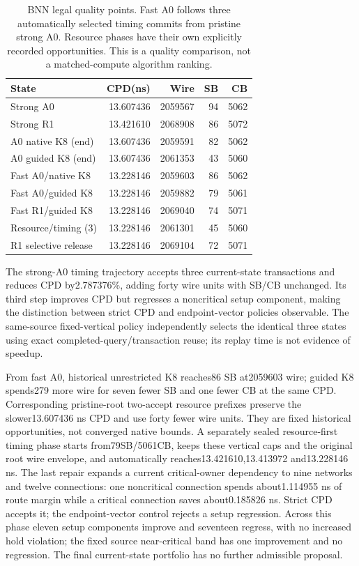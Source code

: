 \documentclass[conference,10pt]{IEEEtran}
\begin{document}
\begin{table}[t]
\centering\caption{BNN legal quality points. Fast A0 follows three automatically selected timing commits from pristine strong A0. Resource phases have their own explicitly recorded opportunities. This is a quality comparison, not a matched-compute algorithm ranking.}
\label{tab:bnn}
\small
\begin{tabular}{lrrrr}\hline
State & CPD(ns) & Wire & SB & CB\\\hline
Strong A0 &13.607436&2059567&94&5062\\
Strong R1 &13.421610&2068908&86&5072\\
A0 native K8 (end) &13.607436&2059591&82&5062\\
A0 guided K8 (end) &13.607436&2061353&43&5060\\
Fast A0/native K8 &13.228146&2059603&86&5062\\
Fast A0/guided K8 &13.228146&2059882&79&5061\\
Fast R1/guided K8 &13.228146&2069040&74&5071\\
Resource/timing (3) &13.228146&2061301&45&5060\\
R1 selective release &13.228146&2069104&72&5071\\\hline
\end{tabular}
\end{table}
The strong-A0 timing trajectory accepts three current-state transactions and reduces CPD by2.787376\%, adding forty wire units with SB/CB unchanged. Its third step improves CPD but regresses a noncritical setup component, making the distinction between strict CPD and endpoint-vector policies observable. The same-source fixed-vertical policy independently selects the identical three states using exact completed-query/transaction reuse; its replay time is not evidence of speedup.

From fast A0, historical unrestricted K8 reaches86 SB at2059603 wire; guided K8 spends279 more wire for seven fewer SB and one fewer CB at the same CPD. Corresponding pristine-root two-accept resource prefixes preserve the slower13.607436 ns CPD and use forty fewer wire units. They are fixed historical opportunities, not converged native bounds. A separately sealed resource-first timing phase starts from79SB/5061CB, keeps these vertical caps and the original root wire envelope, and automatically reaches13.421610,13.413972 and13.228146 ns. The last repair expands a current critical-owner dependency to nine networks and twelve connections: one noncritical connection spends about1.114955 ns of route margin while a critical connection saves about0.185826 ns. Strict CPD accepts it; the endpoint-vector control rejects a setup regression. Across this phase eleven setup components improve and seventeen regress, with no increased hold violation; the fixed source near-critical band has one improvement and no regression. The final current-state portfolio has no further admissible proposal.
\end{document}
